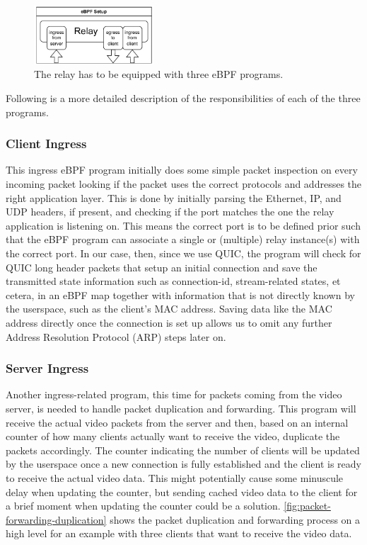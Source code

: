 \vspace{0.5cm}
\begin{figure}[H]
    \centering
    \includegraphics[width=0.4\textwidth]{figures/03_fast_relays/ebpf-setup.drawio.pdf}
    \caption[Types of eBPF programs at relay]{The relay has to be equipped with three eBPF programs.}\label{fig:ebpf-programs}
\end{figure}

\noindent
Following is a more detailed description of the responsibilities of each of the three programs.
\subsubsection{Client Ingress} 
This ingress eBPF program initially does some simple packet inspection on every incoming packet 
looking if the packet uses the correct protocols and addresses the right application layer.
This is done by initially parsing the Ethernet, IP, and UDP headers, if present, and checking if 
the port matches the one the relay application is listening on.
This means the correct port is to be defined prior such that the eBPF program can associate 
a single or (multiple) relay instance(s) with the correct port.
In our case, then, since we use QUIC, the program will check for QUIC long header packets that 
setup an initial connection and save the transmitted state information such as connection-id, 
stream-related states, et cetera, in an eBPF map together with information that is not directly known
by the userspace, such as the client's MAC address.
Saving data like the MAC address directly once the connection is set up allows us to omit any further 
Address Resolution Protocol (ARP) steps later on. 
\subsubsection{Server Ingress}
Another ingress-related program, this time for packets coming from the video server, is needed
to handle packet duplication and forwarding.
This program will receive the actual video packets from the server and then, based on an internal 
counter of how many clients actually want to receive the video, duplicate the packets accordingly.
The counter indicating the number of clients will be updated by the userspace once a new connection 
is fully established and the client is ready to receive the actual video data.
This might potentially cause some minuscule delay when updating the counter, but sending cached 
video data to the client for a brief moment when updating the counter could be a solution. %
\autoref{fig:packet-forwarding-duplication} shows the packet duplication and forwarding process 
on a high level for an example with three clients that want to receive the video data.

